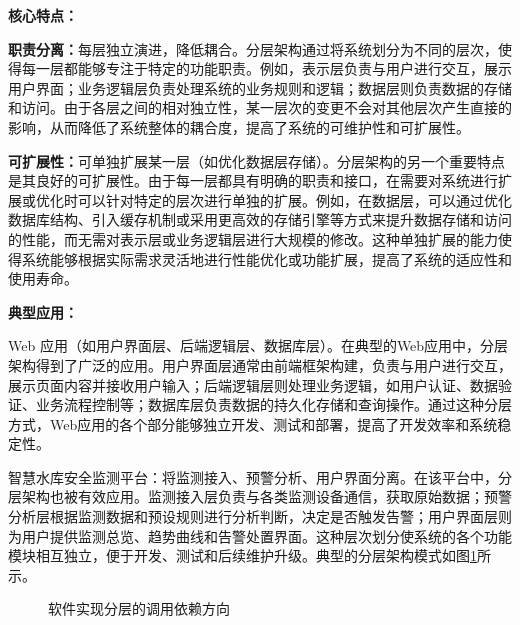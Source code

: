 \textbf{核心特点：}

\textbf{职责分离：}每层独立演进，降低耦合。分层架构通过将系统划分为不同的层次，使得每一层都能够专注于特定的功能职责。例如，表示层负责与用户进行交互，展示用户界面；业务逻辑层负责处理系统的业务规则和逻辑；数据层则负责数据的存储和访问。由于各层之间的相对独立性，某一层次的变更不会对其他层次产生直接的影响，从而降低了系统整体的耦合度，提高了系统的可维护性和可扩展性。

\textbf{可扩展性：}可单独扩展某一层（如优化数据层存储）。分层架构的另一个重要特点是其良好的可扩展性。由于每一层都具有明确的职责和接口，在需要对系统进行扩展或优化时可以针对特定的层次进行单独的扩展。例如，在数据层，可以通过优化数据库结构、引入缓存机制或采用更高效的存储引擎等方式来提升数据存储和访问的性能，而无需对表示层或业务逻辑层进行大规模的修改。这种单独扩展的能力使得系统能够根据实际需求灵活地进行性能优化或功能扩展，提高了系统的适应性和使用寿命。

\textbf{典型应用：}

Web 应用（如用户界面层、后端逻辑层、数据库层）。在典型的Web应用中，分层架构得到了广泛的应用。用户界面层通常由前端框架构建，负责与用户进行交互，展示页面内容并接收用户输入；后端逻辑层则处理业务逻辑，如用户认证、数据验证、业务流程控制等；数据库层负责数据的持久化存储和查询操作。通过这种分层方式，Web应用的各个部分能够独立开发、测试和部署，提高了开发效率和系统稳定性。

智慧水库安全监测平台：将监测接入、预警分析、用户界面分离。在该平台中，分层架构也被有效应用。监测接入层负责与各类监测设备通信，获取原始数据；预警分析层根据监测数据和预设规则进行分析判断，决定是否触发告警；用户界面层则为用户提供监测总览、趋势曲线和告警处置界面。这种层次划分使系统的各个功能模块相互独立，便于开发、测试和后续维护升级。典型的分层架构模式如图\ref{fig:layered-architecture}所示。

\begin{figure}[htbp]
\centering
{}
\caption{软件实现分层的调用依赖方向}
\label{fig:layered-architecture}
\end{figure}

